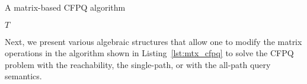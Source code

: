 \begin{algorithm}
	\begin{algorithmic}[1]
		\caption{A matrix-based CFPQ algorithm}
		\label{lst:mtx_cfpq}
		
		 
		\EndFor
		 
		\EndFor
		\EndFor
		
		\EndFor
		\EndWhile
		\State \Return $T$
		\EndFunction
		
	\end{algorithmic}
\end{algorithm}

Next, we present various algebraic structures that allow one to modify the matrix operations in the algorithm shown in Listing~\ref{lst:mtx_cfpq} to solve the CFPQ problem with the reachability, the single-path, or with the all-path query semantics.

